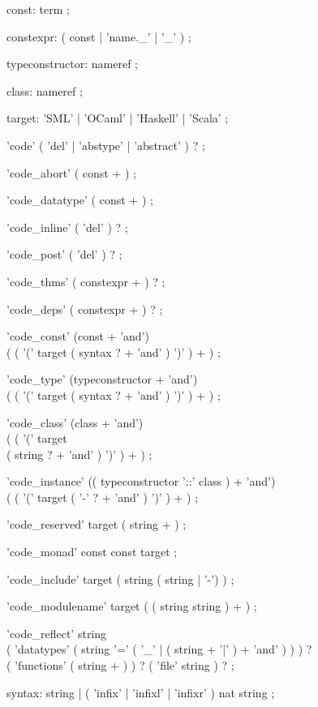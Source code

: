 \begin{isabellebody}
\begin{isamarkuptext}
\begin{rail}
    const: term
    ;

    constexpr: ( const | 'name._' | '_' )
    ;

    typeconstructor: nameref
    ;

    class: nameref
    ;

    target: 'SML' | 'OCaml' | 'Haskell' | 'Scala'
    ;

    'code' ( 'del' | 'abstype' | 'abstract' ) ?
    ;

    'code_abort' ( const + )
    ;

    'code_datatype' ( const + )
    ;

    'code_inline' ( 'del' ) ?
    ;

    'code_post' ( 'del' ) ?
    ;

    'code_thms' ( constexpr + ) ?
    ;

    'code_deps' ( constexpr + ) ?
    ;

    'code_const' (const + 'and') \\
      ( ( '(' target ( syntax ? + 'and' ) ')' ) + )
    ;

    'code_type' (typeconstructor + 'and') \\
      ( ( '(' target ( syntax ? + 'and' ) ')' ) + )
    ;

    'code_class' (class + 'and') \\
      ( ( '(' target \\ ( string ? + 'and' ) ')' ) + )
    ;

    'code_instance' (( typeconstructor '::' class ) + 'and') \\
      ( ( '(' target ( '-' ? + 'and' ) ')' ) + )
    ;

    'code_reserved' target ( string + )
    ;

    'code_monad' const const target
    ;

    'code_include' target ( string ( string | '-') )
    ;

    'code_modulename' target ( ( string string ) + )
    ;

    'code_reflect' string \\
      ( 'datatypes' ( string '=' ( '_' | ( string + '|' ) + 'and' ) ) ) ? \\
      ( 'functions' ( string + ) ) ? ( 'file' string ) ?
    ;

    syntax: string | ( 'infix' | 'infixl' | 'infixr' ) nat string
    ;

  \end{rail}

  \begin{description}


\end{description}
\end{isamarkuptext}
\end{isabellebody}
